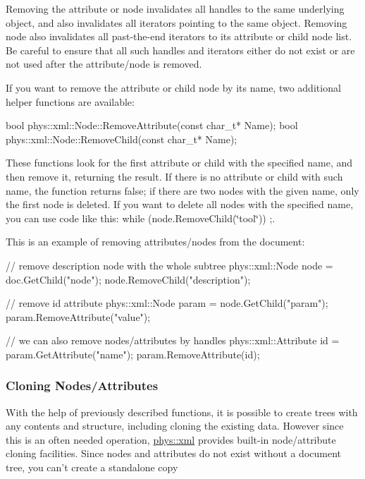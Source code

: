 Removing the attribute or node invalidates all handles to the same underlying object, and also invalidates all iterators pointing to the same object. Removing node also invalidates all past-\/the-\/end iterators to its attribute or child node list. Be careful to ensure that all such handles and iterators either do not exist or are not used after the attribute/node is removed. \par
 \par
 If you want to remove the attribute or child node by its name, two additional helper functions are available: 
\begin{DoxyCode}
 bool phys::xml::Node::RemoveAttribute(const char_t* Name);
 bool phys::xml::Node::RemoveChild(const char_t* Name);
\end{DoxyCode}
 These functions look for the first attribute or child with the specified name, and then remove it, returning the result. If there is no attribute or child with such name, the function returns false; if there are two nodes with the given name, only the first node is deleted. If you want to delete all nodes with the specified name, you can use code like this: while (node.RemoveChild(\char`\"{}tool\char`\"{})) ;. \par
 \par
 This is an example of removing attributes/nodes from the document: 
\begin{DoxyCode}
 // remove description node with the whole subtree
 phys::xml::Node node = doc.GetChild("node");
 node.RemoveChild("description");

 // remove id attribute
 phys::xml::Node param = node.GetChild("param");
 param.RemoveAttribute("value");

 // we can also remove nodes/attributes by handles
 phys::xml::Attribute id = param.GetAttribute("name");
 param.RemoveAttribute(id);
\end{DoxyCode}
 \hypertarget{XMLManual_XMLModifyingCloning}{}\subsubsection{Cloning Nodes/Attributes}\label{XMLManual_XMLModifyingCloning}
With the help of previously described functions, it is possible to create trees with any contents and structure, including cloning the existing data. However since this is an often needed operation, \hyperlink{namespacephys_1_1xml}{phys::xml} provides built-\/in node/attribute cloning facilities. Since nodes and attributes do not exist without a document tree, you can't create a standalone copy
